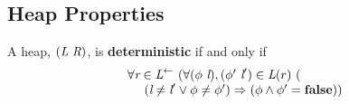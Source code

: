 \subsection{Heap Properties}


%

\begin{definition}
A heap, $(\emph{L}\ \emph{R})$, is \textbf{deterministic} if and only if 
\[
\begin{array}{l}
\forall \cfgnt{r} \in \cfgnt{L}^\leftarrow\ (\forall (\phi\ \cfgnt{l}),(\phi^\prime\ \cfgnt{l}^\prime) \in \cfgnt{L}(r)\ (\\
\ \ \ \ (\cfgnt{l} \neq \cfgnt{l}^\prime \vee \phi \neq \phi^\prime) \Rightarrow (\phi \wedge \phi^\prime = \cfgt{false}))
\end{array}
\]
\end{definition}

%

